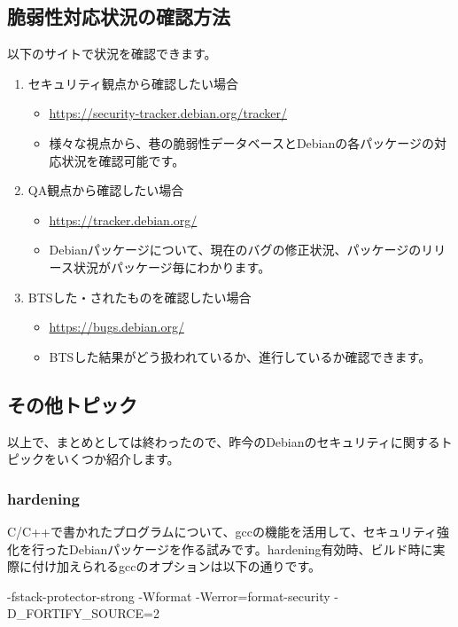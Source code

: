 \documentclass[mingoth,a4paper]{jsarticle}
\begin{document}
\subsection{脆弱性対応状況の確認方法}

 以下のサイトで状況を確認できます。

 \begin{enumerate}
\item セキュリティ観点から確認したい場合
  \begin{itemize}
  \item \url{https://security-tracker.debian.org/tracker/}
  \item 様々な視点から、巷の脆弱性データベースとDebianの各パッケージの対応状況を確認可能です。
  \end{itemize}
\item QA観点から確認したい場合
  \begin{itemize}
  \item \url{https://tracker.debian.org/}
    　\item Debianパッケージについて、現在のバグの修正状況、パッケージのリリース状況がパッケージ毎にわかります。
  \end{itemize}
\item BTSした・されたものを確認したい場合
  \begin{itemize}
  \item \url{https://bugs.debian.org/}
  \item BTSした結果がどう扱われているか、進行しているか確認できます。
  \end{itemize}  
\end{enumerate}

 \subsection{その他トピック}

 以上で、まとめとしては終わったので、昨今のDebianのセキュリティに関するトピックをいくつか紹介します。

 \subsubsection{hardening}

  C/C++で書かれたプログラムについて、gccの機能を活用して、セキュリティ強化を行ったDebianパッケージを作る試みです。hardening有効時、ビルド時に実際に付け加えられるgccのオプションは以下の通りです。
  
\begin{commandline}
-fstack-protector-strong -Wformat -Werror=format-security -D_FORTIFY_SOURCE=2
\end{commandline}
\end{document}
